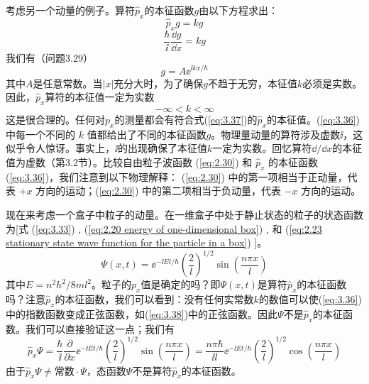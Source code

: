 	考虑另一个动量的例子。算符$\hat{p}_x$的本征函数$g$由以下方程求出：
	\begin{equation*}
		\hat{p}_x g =kg
	\end{equation*}
	\begin{equation}
		\frac{\hbar}{\ii } \frac{\dd g}{\dd x} = kg
		\label{eq:3.35}
	\end{equation}
	我们有（问题3.29）
	\begin{equation}
		g = A\ee ^{\ii kx/\hbar}
		\label{eq:3.36}
	\end{equation}
	其中$A$是任意常数。当$\left|x\right|$充分大时，为了确保$g$不趋于无穷，本征值$k$必须是实数。因此，$\hat{p}_x$算符的本征值一定为实数
	\begin{equation}
		-\infty < k < \infty
		\label{eq:3.37}
	\end{equation}
	这是很合理的。任何对$p_x$的测量都会有符合式(\ref{eq:3.37})的$\hat{p}_x$的本征值。(\ref{eq:3.36}) 中每一个不同的 $k$ 值都给出了不同的本征函数$g$。物理量动量的算符涉及虚数$\ii $，这似乎令人惊讶。事实上，$\ii $的出现确保了本征值$k$一定为实数。回忆算符$\dd /\dd x$的本征值为虚数（第3.2节）。比较自由粒子波函数 (\ref{eq:2.30}) 和 $\hat{p}_x$ 的本征函数 (\ref{eq:3.36})，我们注意到以下物理解释： (\ref{eq:2.30}) 中的第一项相当于正动量，代表 $+x$ 方向的运动；(\ref{eq:2.30}) 中的第二项相当于负动量，代表 $-x$ 方向的运动。

	现在来考虑一个盒子中粒子的动量。在一维盒子中处于静止状态的粒子的状态函数为[式 (\ref{eq:3.33}) , (\ref{eq:2.20 energy of one-dimensional box}) , 和 (\ref{eq:2.23 stationary state wave function for the particle in a box}) ]。
	\begin{equation}
		\Psi\left(x,t\right) = \ee ^{-\ii Et/\hbar}\left(\frac{2}{l}\right)^{1/2}\sin\left(\frac{n\pi x}{l}\right)
		\label{eq:3.38}
	\end{equation}
	其中$E = n^2h^2/8ml^2$。粒子的$p_x$值是确定的吗？即$\Psi\left(x,t\right)$是算符$\hat{p}_x$的本征函数吗？注意$\hat{p}_x$的本征函数，我们可以看到：没有任何实常数$k$的数值可以使(\ref{eq:3.36})中的指数函数变成正弦函数，如(\ref{eq:3.38})中的正弦函数。因此$\Psi$不是$\hat{p}_x$的本征函数。我们可以直接验证这一点；我们有
	\begin{equation*}
		\hat{p}_x\Psi = \frac{\hbar}{\ii }\frac{\partial}{\partial x}\ee ^{-\ii Et/\hbar}\left(\frac{2}{l}\right)^{1/2}\sin\left(\frac{n\pi x}{l}\right) = \frac{n\pi \hbar}{\ii l}\ee ^{-\ii Et/\hbar}\left(\frac{2}{l}\right)^{1/2}\cos\left(\frac{n\pi x}{l}\right)
	\end{equation*}
	由于$\hat{p}_x\Psi \neq \text{常数} \cdot \Psi$，态函数$\Psi$不是算符$\hat{p}_x$的本征函数。

